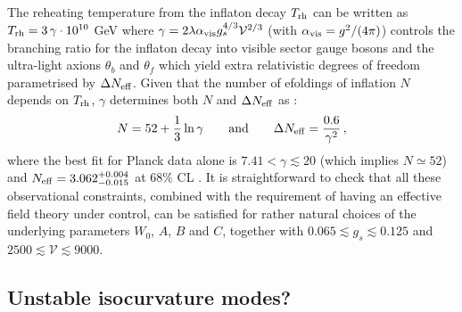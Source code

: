 \documentclass[aps,prd,a4paper,twocolumn,amsmath,showpacs,superscriptaddress,nofootinbib,preprintnumbers]{revtex4-1}
\newcommand{\be}{\begin{equation}}
\newcommand{\ee}{\end{equation}}
\newcommand{\vo}{\mathcal{V}}
\begin{document}
The reheating temperature from the inflaton decay $T_{\rm rh}$ can be written as $T_{\rm rh} = 3\,\gamma\cdot 10^{10}$ GeV where $\gamma = 2 \lambda \alpha_{\rm vis}  g_s^{4/3} \vo^{2/3}$ (with $\alpha_{\rm vis} = g^2/(4\pi)$) controls the branching ratio for the inflaton decay into visible sector gauge bosons and the ultra-light axions $\theta_b$ and $\theta_f$ which yield extra relativistic degrees of freedom parametrised by $\Delta N_{\rm eff}$. Given that the number of efoldings of inflation $N$ depends on $T_{\rm rh}$, $\gamma$ determines both $N$ and $\Delta N_{\rm eff}$ as \cite{Cicoli:2018cgu}:
\be
N =  52+\frac13 \ln\gamma 
\qquad\text{and}\qquad
\Delta N_{\rm eff} = \frac{0.6}{\gamma^2}\,, 
\label{NeffPred}
\ee
where the best fit for Planck data alone is $7.41<\gamma\lesssim 20$ (which implies $N\simeq 52$) and $N_{\rm eff}=3.062^{+0.004}_{-0.015}$ at $68\%$ CL \cite{Cicoli:2020bao}. It is straightforward to check that all these observational constraints, combined with the requirement of having an effective field theory under control, can be satisfied for rather natural choices of the underlying parameters $W_0$, $A$, $B$ and $C$, together with $0.065\lesssim g_s\lesssim 0.125$ and $2500\lesssim \vo \lesssim 9000$.


\subsection{Unstable isocurvature modes?}
\end{document}
